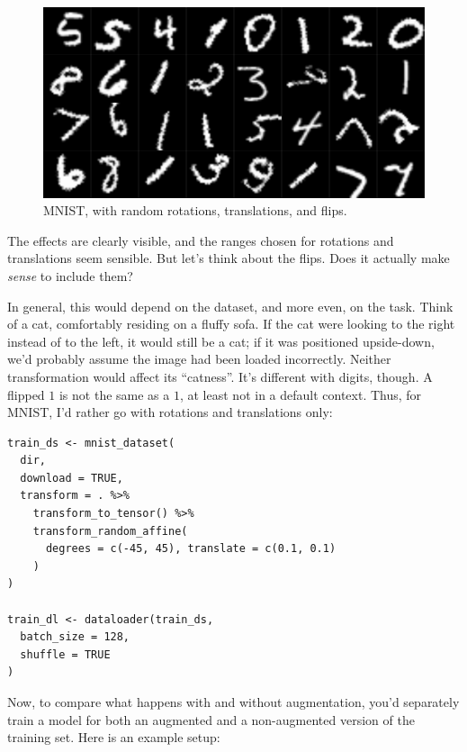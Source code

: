 \documentclass[
  letterpaper,
]{krantz}
\begin{document}
\begin{figure}[H]

{\centering \includegraphics{images/overfitting-mnist-transforms.png}

}

\caption{\label{fig-overfitting-mnist-transforms}MNIST, with random
rotations, translations, and flips.}

\end{figure}

The effects are clearly visible, and the ranges chosen for rotations and
translations seem sensible. But let's think about the flips. Does it
actually make \emph{sense} to include them?

In general, this would depend on the dataset, and more even, on the
task. Think of a cat, comfortably residing on a fluffy sofa. If the cat
were looking to the right instead of to the left, it would still be a
cat; if it was positioned upside-down, we'd probably assume the image
had been loaded incorrectly. Neither transformation would affect its
``catness''. It's different with digits, though. A flipped \(1\) is not
the same as a \(1\), at least not in a default context. Thus, for MNIST,
I'd rather go with rotations and translations only:

\begin{verbatim}
train_ds <- mnist_dataset(
  dir,
  download = TRUE,
  transform = . %>%
    transform_to_tensor() %>%
    transform_random_affine(
      degrees = c(-45, 45), translate = c(0.1, 0.1)
    )
)

train_dl <- dataloader(train_ds,
  batch_size = 128,
  shuffle = TRUE
)
\end{verbatim}

Now, to compare what happens with and without augmentation, you'd
separately train a model for both an augmented and a non-augmented
version of the training set. Here is an example setup:
\end{document}

